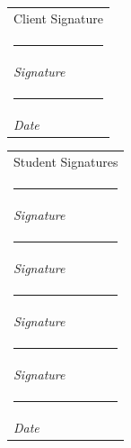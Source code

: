 \documentclass[letterpaper,10pt,titlepage,draftclsnofoot,onecolumn,onesided] {IEEEtran}
\makeatletter
\newcommand{\namesigdate}[2][4cm]{%
  \begin{tabular}{@{}p{#1}@{}}
    #2 \\[2\normalbaselineskip] \hrule \\[0pt]
    {\small \textit{Signature}} \\[2\normalbaselineskip] \hrule \\[0pt]
    {\small \textit{Date}}
  \end{tabular}
}
\newcommand{\studentnamesigdate}[2][4cm]{%
  \begin{tabular}{@{}p{#1}@{}}
    #2 \\[2\normalbaselineskip] \hrule \\[0pt]
    {\small \textit{Signature}} \\[2\normalbaselineskip] \hrule \\[0pt]
    {\small \textit{Signature}} \\[2\normalbaselineskip] \hrule \\[0pt]
    {\small \textit{Signature}} \\[2\normalbaselineskip] \hrule \\[0pt]
    {\small \textit{Signature}} \\[2\normalbaselineskip] \hrule \\[0pt]
    {\small \textit{Date}}
  \end{tabular}
}
\makeatother
\begin{document}



\pagebreak


\pagebreak

\namesigdate{Client Signature} \hfill 
\studentnamesigdate[4cm]{Student Signatures}
\end{document}
